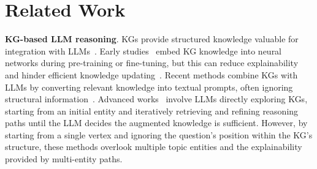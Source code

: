 \section{Related Work}\label{sec:related_work}
\noindent \textbf{KG-based LLM reasoning}.
KGs provide structured knowledge valuable for integration with LLMs~\cite{pan2024unifying}. Early studies~\cite{peters2019knowledge, rogluo2023reasoning, zhang2021poolingformer, li2023chaincok} embed KG knowledge into neural networks during pre-training or fine-tuning, but this can reduce explainability and hinder efficient knowledge updating~\cite{pan2024unifying}.
Recent methods combine KGs with LLMs by converting relevant knowledge into textual prompts, often ignoring structural information~\cite{pan2024unifying, mindmapwen2023}. Advanced works~\cite{tog1.0sun2023think, jiang2023structgpt, tog2.0ma2024think} involve LLMs directly exploring KGs, starting from an initial entity and iteratively retrieving and refining reasoning paths until the LLM decides the augmented knowledge is sufficient.
However, by starting from a single vertex and ignoring the question's position within the KG's structure, these methods overlook multiple topic entities and the explainability provided by multi-entity paths. 
 




